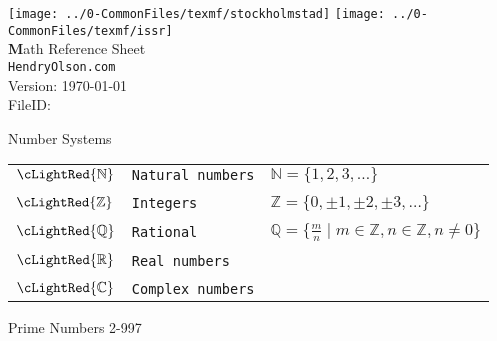 \documentclass[10pt,landscape]{article}
\newcommand{\documenttitle}{Math Reference Sheet}
\newcommand{\documentsubtitle}{HendryOlson.com}
\begin{document}
\raggedright
\footnotesize
\begin{multicols}{3}


\setlength{\premulticols}{1pt}
\setlength{\postmulticols}{1pt}
\setlength{\multicolsep}{1pt}
\setlength{\columnsep}{2pt}


\texttt{[image: ../0-CommonFiles/texmf/stockholmstad]}	\hspace{0.5cm} \texttt{[image: ../0-CommonFiles/texmf/issr]} \\
\vspace{0.5cm}
{\Large\textbf\documenttitle} \\
\vspace{0.5cm}
\texttt{\documentsubtitle} \\

Version: \today\\
FileID: \jobname
	

\begin{mysection}{Number Systems}

\begin{tabular}{@{}ll@{}l@{}}

$\cLightRed{\mathbb{N}}$	& \texttt{Natural numbers} 
							& \qquad $\mathbb{N}=\{1, 2, 3, \ldots  \}$ \\
							&& \\
$\cLightRed{\mathbb{Z}}$  	& \texttt{Integers}
							& \qquad $\mathbb{Z}=\{0, \pm 1, \pm 2, \pm 3, \ldots \}$ \\
							&& \\
$\cLightRed{\mathbb{Q}}$  	& \texttt{Rational}
							& \qquad $\mathbb{Q}=\{\frac{m}{n} \mid m \in \mathbb{Z}, n \in \mathbb{Z}, n \ne 0\}$ \\
							&& \\
$\cLightRed{\mathbb{R}}$  	& \texttt{Real numbers}
							&  \\
							&& \\
$\cLightRed{\mathbb{C}}$  	& \texttt{Complex numbers}
							&  
\end{tabular}
\end{mysection}

\begin{mysection}{Prime Numbers 2-997}


\end{mysection}
\end{multicols}
\end{document}
